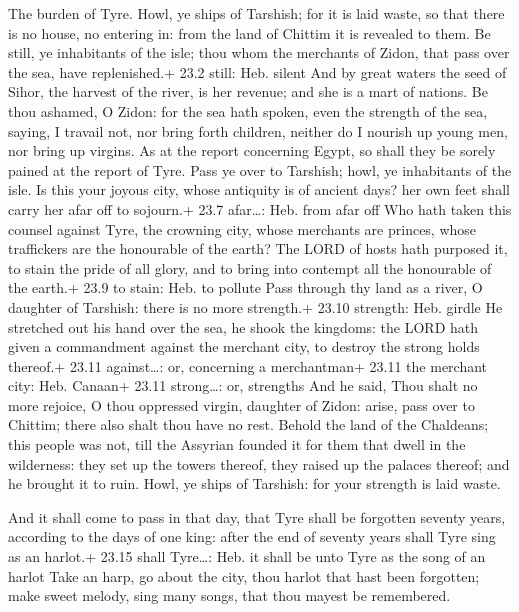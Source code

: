  The burden of Tyre. Howl, ye ships of Tarshish; for it is
laid waste, so that there is no house, no entering in: from the land of
Chittim it is revealed to them.  Be still, ye inhabitants of
the isle; thou whom the merchants of Zidon, that pass over the sea, have
replenished.+ 23.2 still: Heb. silent  And by great waters
the seed of Sihor, the harvest of the river, is her revenue; and she is
a mart of nations.  Be thou ashamed, O Zidon: for the sea
hath spoken, even the strength of the sea, saying, I travail not, nor
bring forth children, neither do I nourish up young men, nor bring up
virgins.  As at the report concerning Egypt, so shall they
be sorely pained at the report of Tyre.  Pass ye over to
Tarshish; howl, ye inhabitants of the isle.  Is this your
joyous city, whose antiquity is of ancient days? her own feet shall
carry her afar off to sojourn.+ 23.7 afar\ldots: Heb. from afar off
 Who hath taken this counsel against Tyre, the crowning
city, whose merchants are princes, whose traffickers are the honourable
of the earth?  The LORD of hosts hath purposed it, to stain
the pride of all glory, and to bring into contempt all the honourable of
the earth.+ 23.9 to stain: Heb. to pollute  Pass through
thy land as a river, O daughter of Tarshish: there is no more strength.+
23.10 strength: Heb. girdle  He stretched out his hand over
the sea, he shook the kingdoms: the LORD hath given a commandment
against the merchant city, to destroy the strong holds thereof.+ 23.11
against\ldots: or, concerning a merchantman+ 23.11 the merchant city:
Heb. Canaan+ 23.11 strong\ldots: or, strengths  And he
said, Thou shalt no more rejoice, O thou oppressed virgin, daughter of
Zidon: arise, pass over to Chittim; there also shalt thou have no rest.
 Behold the land of the Chaldeans; this people was not,
till the Assyrian founded it for them that dwell in the wilderness: they
set up the towers thereof, they raised up the palaces thereof; and he
brought it to ruin.  Howl, ye ships of Tarshish: for your
strength is laid waste.

 And it shall come to pass in that day, that Tyre shall be
forgotten seventy years, according to the days of one king: after the
end of seventy years shall Tyre sing as an harlot.+ 23.15 shall
Tyre\ldots: Heb. it shall be unto Tyre as the song of an harlot
 Take an harp, go about the city, thou harlot that hast
been forgotten; make sweet melody, sing many songs, that thou mayest be
remembered.

